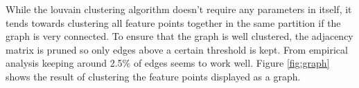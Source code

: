 \documentclass[12pt,journal]{IEEEtran}
\begin{document}
While the louvain clustering algorithm doesn't require any parameters in 
itself, it tends towards clustering all feature points together in the 
same partition if the graph is very connected.  To ensure that the graph 
is well clustered, the adjacency matrix is pruned so only edges above a 
certain threshold is kept. From empirical analysis keeping around 2.5\% 
of edges seems to work well. Figure \ref{fig:graph} shows the result of 
clustering the feature points displayed as a graph.
%
\begin{figure}
\end{figure}
\end{document}
